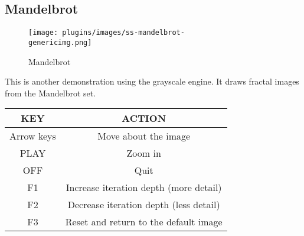 \subsection{Mandelbrot}
\begin{figure}[h!]
\begin{center}
\texttt{[image: plugins/images/ss-mandelbrot-\\genericimg.png]}
\end{center}
\caption{Mandelbrot}
\end{figure}

This is another demonstration using the grayscale engine.  It draws fractal images from the Mandelbrot set.

\begin{table}[h!]
\begin{center}
\begin{tabular}{|c|c|}
\hline
KEY & ACTION \\\hline
Arrow keys & Move about the image \\\hline
PLAY & Zoom in \\\hline
OFF & Quit \\\hline
F1 & Increase iteration depth (more detail) \\\hline
F2 & Decrease iteration depth (less detail) \\\hline
F3 & Reset and return to the default image \\\hline
\end{tabular}
\end{center}
\end{table}
